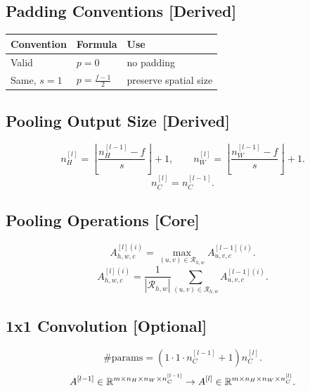 \subsection{Padding Conventions \textbf{[Derived]}}

\begin{center}
\begin{tabular}{lll}
\toprule
Convention & Formula & Use \\
\midrule
Valid & $p=0$ & no padding \\
Same, $s=1$ & $\displaystyle p=\frac{f-1}{2}$ & preserve spatial size \\
\bottomrule
\end{tabular}
\end{center}

\subsection{Pooling Output Size \textbf{[Derived]}}

\[
n_H^{[l]}
=
\left\lfloor
\frac{
n_H^{[l-1]} - f
}{
s
}
\right\rfloor
+1,
\qquad
n_W^{[l]}
=
\left\lfloor
\frac{
n_W^{[l-1]} - f
}{
s
}
\right\rfloor
+1.
\]
\[
n_C^{[l]} = n_C^{[l-1]}.
\]

\subsection{Pooling Operations \textbf{[Core]}}

\[
A_{h,w,c}^{[l](i)}
=
\max_{(u,v)\in \mathcal{R}_{h,w}}
A_{u,v,c}^{[l-1](i)}.
\]
\[
A_{h,w,c}^{[l](i)}
=
\frac{1}{|\mathcal{R}_{h,w}|}
\sum_{(u,v)\in \mathcal{R}_{h,w}}
A_{u,v,c}^{[l-1](i)}.
\]

\subsection{1x1 Convolution \textbf{[Optional]}}

\[
\#\mathrm{params}
=
(1 \cdot 1 \cdot n_C^{[l-1]} + 1)n_C^{[l]}.
\]
\[
A^{[l-1]}
\in
\mathbb{R}^{m \times n_H \times n_W \times n_C^{[l-1]}}
\to
A^{[l]}
\in
\mathbb{R}^{m \times n_H \times n_W \times n_C^{[l]}}.
\]

